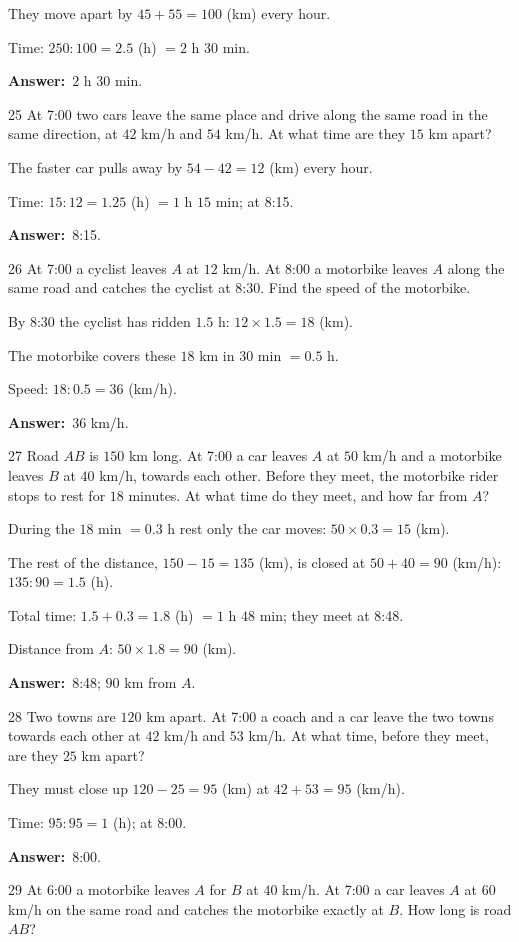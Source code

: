 \documentclass[11pt]{article}
\newif\ifsol \solfalse
\providecommand{\AnsWord}{Đáp số}
\newcommand{\dapso}[1]{\par\textbf{\AnsWord:}\ #1}
\newcommand{\probsol}[1]{%
  \begin{lrbox}{\solmeasure}\begin{minipage}{\dimexpr\linewidth-24pt\relax}#1\end{minipage}\end{lrbox}%
  \ifsol
    \begin{solbox}#1\end{solbox}%
  \else
    \setlength{\solht}{\dimexpr\ht\solmeasure+\dp\solmeasure+0.85cm\relax}%
    \ifdim\solht<1.35cm\setlength{\solht}{1.35cm}\fi
    \begin{tcolorbox}[colback=white,colframe=Line,boxrule=0.8pt,arc=5pt,
      left=8pt,right=8pt,top=4pt,bottom=4pt,height=\solht]{\footnotesize\color{Slate}\itshape\WorkWord}\end{tcolorbox}%
  \fi}
\newcommand{\gap}{\vspace{0.3cm}}
\def\WorkWord{Your work:}
\def\AnsWord{Answer}
\begin{document}
\probsol{
They move apart by $45+55=100$ (km) every hour.\par Time: $250:100=2.5$ (h) $=2$ h $30$ min.
\dapso{$2$ h $30$ min.}}
\gap
\begin{probbox}{25}{\relax}
At 7:00 two cars leave the same place and drive along the same road in the same direction, at $42$ km/h and $54$ km/h. At what time are they $15$ km apart?
\end{probbox}
\probsol{
The faster car pulls away by $54-42=12$ (km) every hour.\par Time: $15:12=1.25$ (h) $=1$ h $15$ min; at 8:15.
\dapso{8:15.}}
\gap
\begin{probbox}{26}{\relax}
At 7:00 a cyclist leaves $A$ at $12$ km/h. At 8:00 a motorbike leaves $A$ along the same road and catches the cyclist at 8:30. Find the speed of the motorbike.
\end{probbox}
\probsol{
By 8:30 the cyclist has ridden $1.5$ h: $12\times1.5=18$ (km).\par The motorbike covers these $18$ km in $30$ min $=0.5$ h.\par Speed: $18:0.5=36$ (km/h).
\dapso{$36$ km/h.}}
\gap
\begin{probbox}{27}{\relax}
Road $AB$ is $150$ km long. At 7:00 a car leaves $A$ at $50$ km/h and a motorbike leaves $B$ at $40$ km/h, towards each other. Before they meet, the motorbike rider stops to rest for $18$ minutes. At what time do they meet, and how far from $A$?
\end{probbox}
\probsol{
During the $18$ min $=0.3$ h rest only the car moves: $50\times0.3=15$ (km).\par
The rest of the distance, $150-15=135$ (km), is closed at $50+40=90$ (km/h): $135:90=1.5$ (h).\par
Total time: $1.5+0.3=1.8$ (h) $=1$ h $48$ min; they meet at 8:48.\par Distance from $A$: $50\times1.8=90$ (km).
\dapso{8:48; $90$ km from $A$.}}
\gap
\begin{probbox}{28}{\relax}
Two towns are $120$ km apart. At 7:00 a coach and a car leave the two towns towards each other at $42$ km/h and $53$ km/h. At what time, before they meet, are they $25$ km apart?
\end{probbox}
\probsol{
They must close up $120-25=95$ (km) at $42+53=95$ (km/h).\par Time: $95:95=1$ (h); at 8:00.
\dapso{8:00.}}
\gap
\begin{probbox}{29}{\relax}
At 6:00 a motorbike leaves $A$ for $B$ at $40$ km/h. At 7:00 a car leaves $A$ at $60$ km/h on the same road and catches the motorbike exactly at $B$. How long is road $AB$?
\end{probbox}
\end{document}
